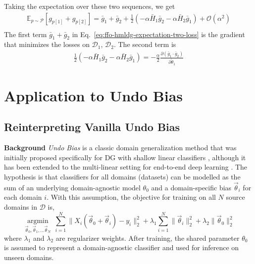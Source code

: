 \documentclass[runningheads]{llncs}
\newcommand{\keypoint}[1]{\vspace{0.1cm}\noindent\textbf{#1}\quad}
\begin{document}
\noindent Taking the expectation over these two sequences, we get
\small
\begin{equation}
\label{eq:ffo-hmldg-expectation-two-loss}
\begin{aligned}
 \mathbb{E}_{p\sim\mathcal{P}}[g_{p[1]}+g_{p[2]}] = \bar{g}_1 + \bar{g}_2 + \frac{1}{2} (- \alpha \bar{H}_1 \bar{g}_2 - \alpha \bar{H}_2 \bar{g}_1 ) + \mathcal{O}(\alpha^2)\\
\end{aligned}
\end{equation}
\normalsize
The first term $\bar{g}_1 + \bar{g}_2$ in Eq.~\ref{eq:ffo-hmldg-expectation-two-loss} is the gradient that minimizes the losses on $\mathcal{D}_1$, $\mathcal{D}_2$. The second term is
\small
\begin{equation}
    \begin{aligned}
    \frac{1}{2} (- \alpha \bar{H}_1 \bar{g}_2 - \alpha \bar{H}_2 \bar{g}_1 ) = - \frac{\alpha}{2} \frac{\partial (\bar{g}_1 \cdot \bar{g}_2)}{\partial \tilde{\theta}_1}
    \end{aligned}
\end{equation}
\normalsize


\section{Application to Undo Bias}\label{appendix:sec:undo}
\subsection{Reinterpreting Vanilla Undo Bias}
\keypoint{Background}
\emph{Undo Bias} is a classic domain generalization method that was initially proposed specifically for DG with shallow linear classifiers \cite{ECCV12_Khosla}, although it has been extended to the multi-linear setting for end-to-end deep learning \cite{da2017dg}. The hypothesis is that classifiers for all domains (datasets) can be modelled as the sum of an underlying domain-agnostic model $\theta_0$ and a domain-specific bias $\vec{\theta}_i$ for each domain $i$. With this assumption, the objective for training on all $N$ source domains in $\mathcal{D}$ is,
\small
\begin{equation}
\label{eq:Undo-Bias}
\underset{\vec{\theta}_{0}, \vec{\theta}_{1},\dots \vec{\theta}_{N}}{\operatorname{argmin}}~ \sum_{i=1}^{N} \| \mathit{X}_{i}(\vec{\theta}_{0} + \mathit{\vec{\theta}_{i}}) - y_{i}  \|_{2}^{2} +\lambda_{1} \sum_{i=1}^{N} \|\mathit{\vec{\theta}_{i}} \|_{2}^{2} + \lambda_{2} \|\vec{\theta}_{0} \|_{2}^{2} 
\end{equation}
\normalsize
where $\lambda_{1}$ and $\lambda_{2}$ are regularizer weights.
After training, the shared parameter $\theta_0$ is assumed to represent a domain-agnostic classifier and used for inference on unseen domains.
\end{document}
